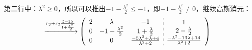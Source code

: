\documentclass[a4paper]{report}
\begin{document}
\begin{jie}
第二行中：$\lambda^2\geq 0$，所以可以推出$-1-\frac{\lambda^2}{2}\leq-1$，即$-1-\frac{\lambda^2}{2}\neq 0$，继续高斯消元：
\begin{equation*}
\xrightarrow{\substack{r_{3}+r_2\frac{5-2\lambda}{1+\frac{\lambda^2}{2}}}}
{
 \left(
 \begin{array}{c:c}
\begin{matrix}
2 & \lambda & -1 \\
0 & -1-\frac{\lambda^2}{2} & 1+\frac{\lambda}{2} \\
0 & 0 & \frac{-5\lambda^2+\lambda+4}{\lambda^2+2}
\end{matrix}&
\begin{matrix}
1  \\
2-\frac{\lambda}{2}\\
\frac{-\lambda^2-13\lambda+14}{\lambda^2+2}
\end{matrix}
\end{array}
\right)
}
\end{equation*}


\end{jie}
\end{document}
